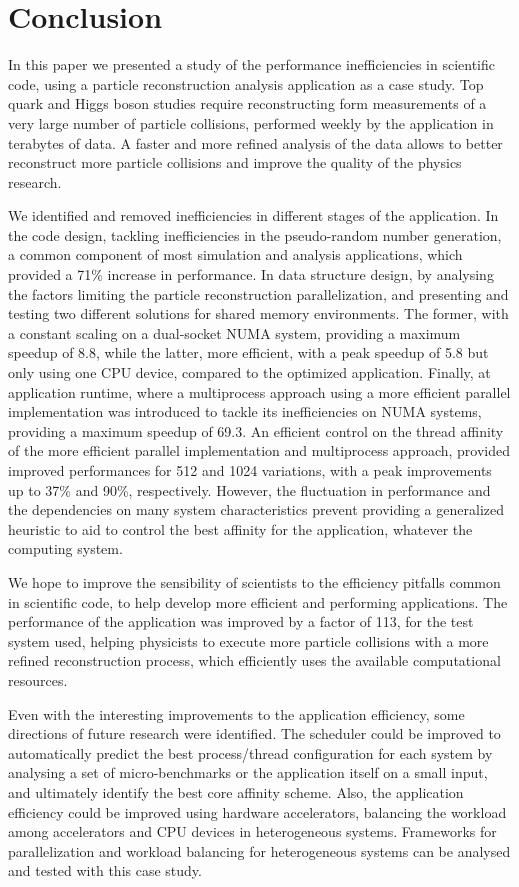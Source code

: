 \section{Conclusion}
\label{conclusion}

In this paper we presented a study of the performance inefficiencies in scientific code, using a particle reconstruction analysis application as a case study. Top quark and Higgs boson studies require reconstructing form measurements of a very large number of particle collisions, performed weekly by the \tth application in terabytes of data. A faster and more refined analysis of the data allows to better reconstruct more particle collisions and improve the quality of the physics research.

We identified and removed inefficiencies in different stages of the application. In the code design, tackling inefficiencies in the pseudo-random number generation, a common component of most simulation and analysis applications, which provided a 71\% increase in performance. In data structure design, by analysing the factors limiting the particle reconstruction parallelization, and presenting and testing two different solutions for shared memory environments. The former, with a constant scaling on a dual-socket NUMA system, providing a maximum speedup of 8.8, while the latter, more efficient, with a peak speedup of 5.8 but only using one CPU device, compared to the optimized application. Finally, at application runtime, where a multiprocess approach using a more efficient parallel implementation was introduced to tackle its inefficiencies on NUMA systems, providing a maximum speedup of 69.3. An efficient control on the thread affinity of the more efficient parallel implementation and multiprocess approach, provided improved performances for 512 and 1024 variations, with a peak improvements up to 37\% and 90\%, respectively. However, the fluctuation in performance and the dependencies on many system characteristics prevent providing a generalized heuristic to aid to control the best affinity for the application, whatever the computing system.

We hope to improve the sensibility of scientists to the efficiency pitfalls common in scientific code, to help develop more efficient and performing applications. The performance of the \tth application was improved by a factor of 113, for the test system used, helping physicists to execute more particle collisions with a more refined reconstruction process, which efficiently uses the available computational resources.

Even with the interesting improvements to the application efficiency, some directions of future research were identified. The scheduler could be improved to automatically predict the best process/thread configuration for each system by analysing a set of micro-benchmarks or the application itself on a small input, and ultimately identify the best core affinity scheme. Also, the application efficiency could be improved using hardware accelerators, balancing the workload among accelerators and CPU devices in heterogeneous systems. Frameworks for parallelization and workload balancing for heterogeneous systems can be analysed and tested with this case study.
